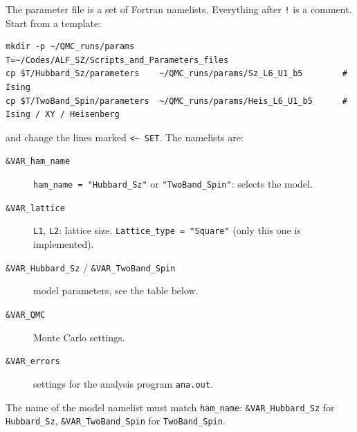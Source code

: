 \documentclass[11pt,a4paper]{article}
\newcommand{\f}[1]{\texttt{#1}}          %
\begin{document}
The parameter file is a set of Fortran namelists. Everything after \f{!} is a comment.
Start from a template:
\begin{lstlisting}
mkdir -p ~/QMC_runs/params
T=~/Codes/ALF_SZ/Scripts_and_Parameters_files
cp $T/Hubbard_Sz/parameters    ~/QMC_runs/params/Sz_L6_U1_b5        # Ising
cp $T/TwoBand_Spin/parameters  ~/QMC_runs/params/Heis_L6_U1_b5      # Ising / XY / Heisenberg
\end{lstlisting}
and change the lines marked \f{<-- SET}. The namelists are:

\begin{description}
\item[\f{\&VAR\_ham\_name}] \f{ham\_name = "Hubbard\_Sz"} or \f{"TwoBand\_Spin"}: selects the model.
\item[\f{\&VAR\_lattice}] \f{L1}, \f{L2}: lattice size. \f{Lattice\_type = "Square"} (only this one is implemented).
\item[\f{\&VAR\_Hubbard\_Sz} / \f{\&VAR\_TwoBand\_Spin}] model parameters, see the table below.
\item[\f{\&VAR\_QMC}] Monte Carlo settings.
\item[\f{\&VAR\_errors}] settings for the analysis program \f{ana.out}.
\end{description}
The name of the model namelist must match \f{ham\_name}: \f{\&VAR\_Hubbard\_Sz} for
\f{Hubbard\_Sz}, \f{\&VAR\_TwoBand\_Spin} for \f{TwoBand\_Spin}.
\end{document}
